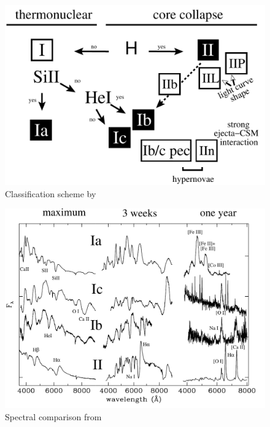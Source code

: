 \begin{figure}[tb] %
   \centering
   \includegraphics[width=\textwidth]{chapter_intro/plots/sn_classification.pdf} 
   \caption{Classification scheme by \citet{2003LNP...598...21T}}
   \label{fig:sn_classification}
\end{figure}

\begin{figure}[tb] %
   \centering
   \includegraphics[width=\textwidth]{chapter_intro/plots/sn_class_spectra.pdf} 
   \caption{Spectral comparison from \citet{2003LNP...598...21T}}
   \label{fig:sn_class_spectra}
\end{figure}

